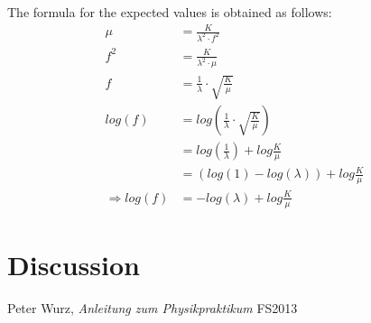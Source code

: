 \documentclass{scrreprt}
\begin{document}
The formula for the expected values is obtained as follows:
\begin{align}
\mu &= \frac{K}{\lambda^2 \cdot f^2}\\
f^2 &= \frac{K}{\lambda^2\cdot\mu}\\
f &= \frac{1}{\lambda}\cdot\sqrt{\frac{K}{\mu}}\\
log(f) &= log\left(\frac{1}{\lambda}\cdot\sqrt{\frac{K}{\mu}}\right)\\
&=log\left(\frac{1}{\lambda}\right) + log\frac{K}{\mu}\\
&=\left(log(1) - log(\lambda)\right) + log\frac{K}{\mu}\\
\Rightarrow log(f) &=-log(\lambda) + log\frac{K}{\mu}
\end{align}


\section{Discussion}

\begin{thebibliography}{9}

  Peter Wurz,
  \emph{Anleitung zum Physikpraktikum}
  FS2013

\end{thebibliography}
\end{document}
